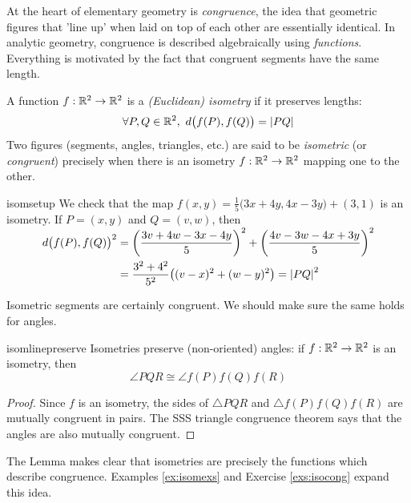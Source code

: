 At the heart of elementary geometry is \emph{congruence}, the idea that geometric figures that 'line up' when laid on top of each other are essentially identical. In analytic geometry, congruence is described algebraically using \emph{functions}. Everything is motivated by the fact that congruent segments have the same length.

\begin{defn}{}{}
	A function $f:\mathbb{R}^2\to\mathbb{R}^2$ is a \emph{(Euclidean) isometry} if it preserves lengths:\footnotemark
	\[
		\forall P,Q\in\R^2,\ d\bigl(f(P),f(Q)\bigr)=\nm{PQ}
	\]
	Two figures (segments, angles, triangles, etc.) are said to be \emph{isometric} (or \emph{congruent}) precisely when there is an isometry $f:\mathbb{R}^2\to\mathbb{R}^2$ mapping one to the other.
\end{defn}



\begin{example}{}{isomsetup}
	We check that the map $f(x,y)=\frac 15\bigl(3x+4y,4x-3y\bigr)+(3,1)$ is an isometry. If $P=(x,y)$ and $Q=(v,w)$, then
	\begin{align*}
		d\bigl(f(P),f(Q)\bigr)^2&=\smash[t]{\left(\frac{3v+4w-3x-4y}5\right)^2+\left(\frac{4v-3w-4x+3y}5\right)^2}\\
		&=\frac{3^2+4^2}{5^2}\bigl((v-x)^2+(w-y)^2\bigr) =\left| PQ\right|^2
	\end{align*}
\end{example}

Isometric segments are certainly congruent. We should make sure the same holds for angles.

\begin{lemm}{}{isomlinepreserve}
	Isometries preserve (non-oriented) angles: if $f:\mathbb{R}^2\to\mathbb{R}^2$ is an isometry, then
	\[
	  \angle PQR\cong \angle f(P)f(Q)f(R)
	\]
\end{lemm}

\begin{proof}
	Since $f$ is an isometry, the sides of $\triangle PQR$ and $\triangle f(P)f(Q)f(R)$ are mutually congruent in pairs. The SSS triangle congruence theorem says that the angles are also mutually congruent.
\end{proof}

The Lemma makes clear that isometries are precisely the functions which describe congruence. Examples \ref{ex:isomexs} and Exercise \ref{exs:isocong} expand this idea.

